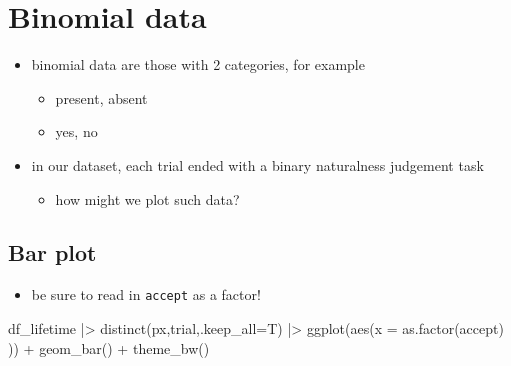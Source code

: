 \documentclass[
  letterpaper,
  DIV=11,
  numbers=noendperiod]{scrartcl}
\newenvironment{Shaded}{\begin{snugshade}}{\end{snugshade}}
\newcommand{\AttributeTok}[1]{\textcolor[rgb]{0.40,0.45,0.13}{#1}}
\newcommand{\FunctionTok}[1]{\textcolor[rgb]{0.28,0.35,0.67}{#1}}
\newcommand{\NormalTok}[1]{\textcolor[rgb]{0.00,0.23,0.31}{#1}}
\newcommand{\SpecialCharTok}[1]{\textcolor[rgb]{0.37,0.37,0.37}{#1}}
\providecommand{\tightlist}{%
  \setlength{\itemsep}{0pt}\setlength{\parskip}{0pt}}\usepackage{longtable,booktabs,array}
\begin{document}
\hypertarget{binomial-data}{%
\section{Binomial data}\label{binomial-data}}

\begin{itemize}
\tightlist
\item
  binomial data are those with 2 categories, for example

  \begin{itemize}
  \tightlist
  \item
    present, absent
  \item
    yes, no
  \end{itemize}
\item
  in our dataset, each trial ended with a binary naturalness judgement
  task

  \begin{itemize}
  \tightlist
  \item
    how might we plot such data?
  \end{itemize}
\end{itemize}

\hypertarget{bar-plot}{%
\subsection{Bar plot}\label{bar-plot}}

\begin{itemize}
\tightlist
\item
  be sure to read in \texttt{accept} as a factor!
\end{itemize}

\begin{Shaded}
\begin{Highlighting}[]
\NormalTok{df\_lifetime }\SpecialCharTok{|\textgreater{}} 
  \FunctionTok{distinct}\NormalTok{(px,trial,}\AttributeTok{.keep\_all=}\NormalTok{T) }\SpecialCharTok{|\textgreater{}} 
  \FunctionTok{ggplot}\NormalTok{(}\FunctionTok{aes}\NormalTok{(}\AttributeTok{x =} \FunctionTok{as.factor}\NormalTok{(accept) )) }\SpecialCharTok{+}
  \FunctionTok{geom\_bar}\NormalTok{() }\SpecialCharTok{+}
  \FunctionTok{theme\_bw}\NormalTok{()}
\end{Highlighting}
\end{Shaded}
\end{document}

